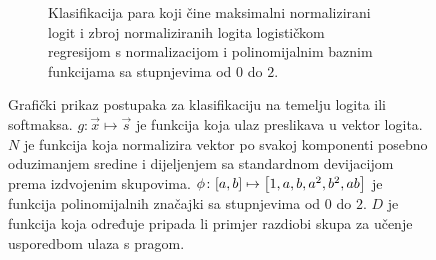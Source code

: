 \documentclass{beamer}
\begin{document}
\begin{frame}[shrink]{}
\begin{minipage}[b]{1.4\textwidth}
\begin{figure}
	\begin{subfigure}[t]{1\textwidth}
		\centering
		\caption{Klasifikacija para koji čine maksimalni normalizirani logit i zbroj normaliziranih logita logističkom regresijom s normalizacijom i polinomijalnim baznim funkcijama sa stupnjevima od $0$ do $2$.}
		\label{subfig:graf-ood-normalizacija-logreg}
	\end{subfigure}
	\caption{Grafički prikaz postupaka za klasifikaciju na temelju logita ili softmaksa. $g\colon\vec x\mapsto\vec s$ je funkcija koja ulaz preslikava u vektor logita. $N$ je funkcija koja normalizira vektor po svakoj komponenti posebno oduzimanjem sredine i dijeljenjem sa standardnom devijacijom prema izdvojenim skupovima. $\phi\colon\sbr{a,b}\mapsto\sbr{1,a,b,a^2,b^2,ab}$ je funkcija polinomijalnih značajki sa stupnjevima od $0$ do $2$. $D$ je funkcija koja određuje pripada li primjer razdiobi skupa za učenje usporedbom ulaza s pragom.}
	\label{fig:ood-racunski-grafovi}
\end{figure}
\end{minipage}
\end{frame}
\end{document}
